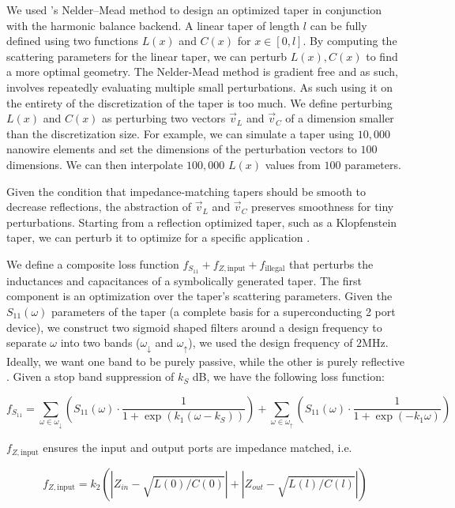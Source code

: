 We used 's Nelder–Mead method to design an optimized taper in conjunction with the
harmonic balance backend. A linear taper of length $l$ can be fully defined using two 
functions $L(x)$ and $C(x)$ for $x\in[0, l]$.
By computing the scattering parameters for the linear taper, we can perturb $L(x), C(x)$ to
find a more optimal geometry. The Nelder-Mead method is gradient free and as such, involves
repeatedly evaluating multiple small perturbations. As such using it on the entirety of the 
discretization of the taper is too much. We define perturbing $L(x)$ and $C(x)$ as perturbing
two vectors $\vec v_L$ and $\vec v_C$ of a dimension smaller than the discretization size.
For example, we can simulate a taper using $10,000$ nanowire elements and set the dimensions of
the perturbation vectors to $100$ dimensions. We can then interpolate $100,000$ $L(x)$ values 
from $100$ parameters.

Given the condition that impedance-matching tapers should be smooth to decrease reflections,
the abstraction of $\vec v_L$ and $\vec v_C$ preserves smoothness for tiny perturbations.
Starting from a reflection optimized taper, such as a Klopfenstein taper, we can perturb
it to optimize for a specific application \cite{klopfenstein_transmission_1956}.

We define a composite loss function 
$f_{S_{11}} + f_{Z, \text{input}} + f_{\text{illegal}}$ 
that perturbs the inductances and capacitances
of a symbolically generated taper. The first component is an optimization over the taper's
scattering parameters. Given the $S_{11}(\omega)$ parameters of the taper (a complete basis for a
superconducting 2 port device), we construct two sigmoid shaped filters around a design
frequency to separate $\omega$ into two bands ($\omega_\downarrow$ and $\omega_\uparrow$), we
used the design frequency of $2$\si{MHz}. 
Ideally, we want one band to be purely passive, while the other is purely reflective \cite{optimum-taper}.
Given a stop band suppression of $k_S$ \si{dB}, we have the following loss function:

$$f_{S_{11}} = \sum_{\omega \in \omega_\downarrow} \left ( S_{11}(\omega) \cdot \dfrac{1}{1+\exp {(k_1 (\omega - k_S )) }} \right ) + \sum_{\omega \in \omega_\uparrow} \left ( S_{11}(\omega) \cdot \dfrac{1}{1+\exp {(-k_1 \omega) }} \right ) $$

$f_{Z, \text{input}}$ ensures the input and output ports are impedance matched, i.e.

$$f_{Z, \text{input}} = k_2 \left (  
\left |   Z_{in} - \sqrt{L(0)/C(0)}    \right | +
\left |   Z_{out} - \sqrt{L(l)/C(l)}    \right |
\right)$$

